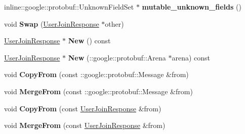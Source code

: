 \begin{DoxyCompactItemize}
\item 
\hypertarget{classSimpleChat_1_1UserJoinResponse_a23f46f596005774a0873d889b00f97c5}{inline\-::google\-::protobuf\-::\-Unknown\-Field\-Set $\ast$ {\bfseries mutable\-\_\-unknown\-\_\-fields} ()}\label{classSimpleChat_1_1UserJoinResponse_a23f46f596005774a0873d889b00f97c5}

\item 
\hypertarget{classSimpleChat_1_1UserJoinResponse_ab94a5f942a0e4a200c8351b0cbd36020}{void {\bfseries Swap} (\hyperlink{classSimpleChat_1_1UserJoinResponse}{User\-Join\-Response} $\ast$other)}\label{classSimpleChat_1_1UserJoinResponse_ab94a5f942a0e4a200c8351b0cbd36020}

\item 
\hypertarget{classSimpleChat_1_1UserJoinResponse_aa2e8a1085ae0fcb0b672776215d696c2}{\hyperlink{classSimpleChat_1_1UserJoinResponse}{User\-Join\-Response} $\ast$ {\bfseries New} () const }\label{classSimpleChat_1_1UserJoinResponse_aa2e8a1085ae0fcb0b672776215d696c2}

\item 
\hypertarget{classSimpleChat_1_1UserJoinResponse_a96d7e67a29afa3393dc80fc3a61ff7e7}{\hyperlink{classSimpleChat_1_1UserJoinResponse}{User\-Join\-Response} $\ast$ {\bfseries New} (\-::google\-::protobuf\-::\-Arena $\ast$arena) const }\label{classSimpleChat_1_1UserJoinResponse_a96d7e67a29afa3393dc80fc3a61ff7e7}

\item 
\hypertarget{classSimpleChat_1_1UserJoinResponse_a294fddc7967202fa7900aab998eceb81}{void {\bfseries Copy\-From} (const \-::google\-::protobuf\-::\-Message \&from)}\label{classSimpleChat_1_1UserJoinResponse_a294fddc7967202fa7900aab998eceb81}

\item 
\hypertarget{classSimpleChat_1_1UserJoinResponse_ac83c9115a5c0cd55e0347fcc3ab4b2a3}{void {\bfseries Merge\-From} (const \-::google\-::protobuf\-::\-Message \&from)}\label{classSimpleChat_1_1UserJoinResponse_ac83c9115a5c0cd55e0347fcc3ab4b2a3}

\item 
\hypertarget{classSimpleChat_1_1UserJoinResponse_ac31245541435fbfd50017fdb4641fc92}{void {\bfseries Copy\-From} (const \hyperlink{classSimpleChat_1_1UserJoinResponse}{User\-Join\-Response} \&from)}\label{classSimpleChat_1_1UserJoinResponse_ac31245541435fbfd50017fdb4641fc92}

\item 
\hypertarget{classSimpleChat_1_1UserJoinResponse_a3a496db84f7ecbcb2daa5430dfae8849}{void {\bfseries Merge\-From} (const \hyperlink{classSimpleChat_1_1UserJoinResponse}{User\-Join\-Response} \&from)}\label{classSimpleChat_1_1UserJoinResponse_a3a496db84f7ecbcb2daa5430dfae8849}


\end{DoxyCompactItemize}
